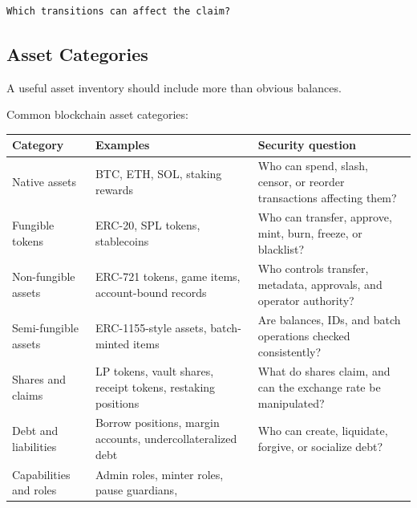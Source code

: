 \begin{lstlisting}
Which transitions can affect the claim?
\end{lstlisting}

\subsection{Asset Categories}

A useful asset inventory should include more than obvious balances.

Common blockchain asset categories:

{\def\LTcaptype{none} %
\begin{longtable}[]{@{}
  >{\raggedright\arraybackslash}p{}
  >{\raggedright\arraybackslash}p{}
  >{\raggedright\arraybackslash}p{}@{}}
\toprule\noalign{}
\begin{minipage}[b]{\linewidth}\raggedright
Category
\end{minipage} & \begin{minipage}[b]{\linewidth}\raggedright
Examples
\end{minipage} & \begin{minipage}[b]{\linewidth}\raggedright
Security question
\end{minipage} \\
\midrule\noalign{}
\endhead
\bottomrule\noalign{}
\endlastfoot
Native assets & BTC, ETH, SOL, staking rewards & Who can spend, slash,
censor, or reorder transactions affecting them? \\
Fungible tokens & ERC-20, SPL tokens, stablecoins & Who can transfer,
approve, mint, burn, freeze, or blacklist? \\
Non-fungible assets & ERC-721 tokens, game items, account-bound records
& Who controls transfer, metadata, approvals, and operator authority? \\
Semi-fungible assets & ERC-1155-style assets, batch-minted items & Are
balances, IDs, and batch operations checked consistently? \\
Shares and claims & LP tokens, vault shares, receipt tokens, restaking
positions & What do shares claim, and can the exchange rate be
manipulated? \\
Debt and liabilities & Borrow positions, margin accounts,
undercollateralized debt & Who can create, liquidate, forgive, or
socialize debt? \\
Capabilities and roles & Admin roles, minter roles, pause guardians,

\end{longtable}}
